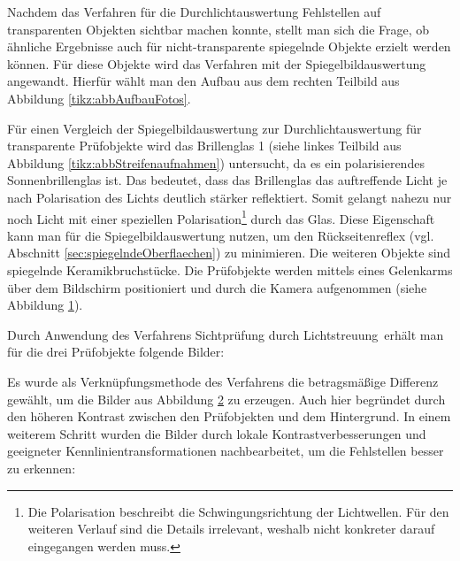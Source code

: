 Nachdem das Verfahren für die Durchlichtauswertung Fehlstellen auf transparenten Objekten sichtbar machen konnte, stellt man sich die Frage, ob ähnliche Ergebnisse auch für nicht-transparente spiegelnde Objekte erzielt werden können.
Für diese Objekte wird das Verfahren mit der Spiegelbildauswertung angewandt.
Hierfür wählt man den Aufbau aus dem rechten Teilbild aus Abbildung \ref{tikz:abbAufbauFotos}.

\p
Für einen Vergleich der Spiegelbildauswertung zur Durchlichtauswertung für transparente Prüfobjekte wird das Brillenglas 1 (siehe linkes Teilbild aus Abbildung \ref{tikz:abbStreifenaufnahmen}) untersucht, da es ein polarisierendes Sonnenbrillenglas ist.
Das bedeutet, dass das Brillenglas das auftreffende Licht je nach Polarisation des Lichts deutlich stärker reflektiert.
Somit gelangt nahezu nur noch Licht mit einer speziellen Polarisation\footnote{
Die Polarisation beschreibt die Schwingungsrichtung der Lichtwellen.
Für den weiteren Verlauf sind die Details irrelevant, weshalb nicht konkreter darauf eingegangen werden muss.
} durch das Glas.
Diese Eigenschaft kann man für die Spiegelbildauswertung nutzen, um den Rückseitenreflex (vgl. Abschnitt \ref{sec:spiegelndeOberflaechen}) zu minimieren.
Die weiteren Objekte sind spiegelnde Keramikbruchstücke.
Die Prüfobjekte werden mittels eines Gelenkarms über dem Bildschirm positioniert und durch die Kamera aufgenommen (siehe Abbildung \ref{tikz:abbStreifenaufnahmenSpLichtstreuung}).

{
	\begin{figure}[H]
		\centering
		
		\label{tikz:abbStreifenaufnahmenSpLichtstreuung}
	\end{figure}
}

\noindent
Durch Anwendung des Verfahrens \glqq Sichtprüfung durch Lichtstreuung\grqq ~erhält man für die drei Prüfobjekte folgende Bilder:

{
	\begin{figure}[H]
		\centering
		
		\label{tikz:abbCombinePatternPicturesSpLichtstreuung}
	\end{figure}
}

\noindent
Es wurde als Verknüpfungsmethode des Verfahrens die betragsmäßige Differenz gewählt, um die Bilder aus Abbildung \ref{tikz:abbCombinePatternPicturesSpLichtstreuung} zu erzeugen.
Auch hier begründet durch den höheren Kontrast zwischen den Prüfobjekten und dem Hintergrund.
In einem weiterem Schritt wurden die Bilder durch lokale Kontrastverbesserungen und geeigneter Kennlinientransformationen nachbearbeitet, um die Fehlstellen besser zu erkennen:

